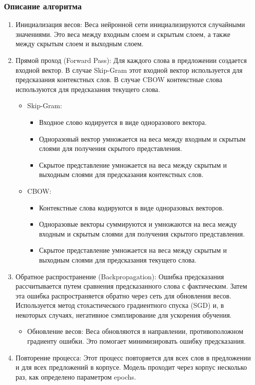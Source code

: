 		\subsubsection{Описание алгоритма}
			\begin{enumerate}
				\item Инициализация весов: Веса нейронной сети инициализируются случайными значениями. Это веса между входным слоем и скрытым слоем, а также между скрытым слоем и выходным слоем.
				\item Прямой проход (Forward Pass): Для каждого слова в предложении создается входной вектор. В случае Skip-Gram этот входной вектор используется для предсказания контекстных слов. В случае CBOW контекстные слова используются для предсказания текущего слова.
				\begin{itemize}
					\item Skip-Gram:
					\begin{itemize}
						\item Входное слово кодируется в виде одноразового вектора.
						\item Одноразовый вектор умножается на веса между входным и скрытым слоями для получения скрытого представления.
						\item Скрытое представление умножается на веса между скрытым и выходным слоями для предсказания контекстных слов.
					\end{itemize}
					\item CBOW:
					\begin{itemize}
						\item Контекстные слова кодируются в виде одноразовых векторов.
						\item Одноразовые векторы суммируются и умножаются на веса между входным и скрытым слоями для получения скрытого представления.
						\item Скрытое представление умножается на веса между скрытым и выходным слоями для предсказания текущего слова.
					\end{itemize}								
				\end{itemize}
				\item Обратное распространение (Backpropagation): Ошибка предсказания рассчитывается путем сравнения предсказанного слова с фактическим. Затем эта ошибка распространяется обратно через сеть для обновления весов. Используется метод стохастического градиентного спуска (SGD) и, в некоторых случаях, негативное сэмплирование для ускорения обучения.
				\begin{itemize}
					\item Обновление весов: Веса обновляются в направлении, противоположном градиенту ошибки. Это помогает минимизировать ошибку предсказания.
				\end{itemize}
				\item Повторение процесса: Этот процесс повторяется для всех слов в предложении и для всех предложений в корпусе. Модель проходит через корпус несколько раз, как определено параметром epochs.
			\end{enumerate}
	
